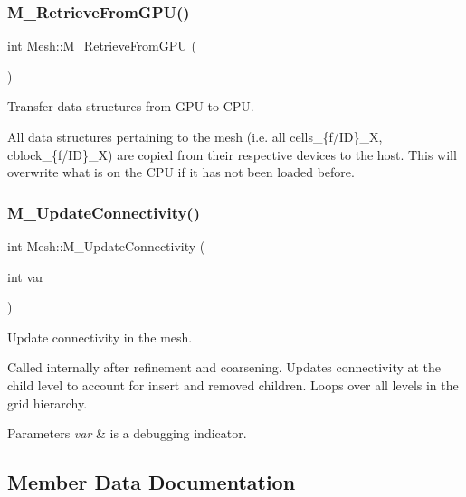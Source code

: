\subsubsection{\texorpdfstring{M\+\_\+\+Retrieve\+From\+G\+P\+U()}{M\_RetrieveFromGPU()}}
{\footnotesize\ttfamily int Mesh\+::\+M\+\_\+\+Retrieve\+From\+G\+PU (\begin{DoxyParamCaption}{ }\end{DoxyParamCaption})}



Transfer data structures from G\+PU to C\+PU. 

All data structures pertaining to the mesh (i.\+e. all cells\+\_\+\{f/\+ID\}\+\_\+X, cblock\+\_\+\{f/\+ID\}\+\_\+X) are copied from their respective devices to the host. This will overwrite what is on the C\+PU if it has not been loaded before. \mbox{\label{classMesh_af4d2218c68524d3c6eaa2065be392cb1}} 
\subsubsection{\texorpdfstring{M\+\_\+\+Update\+Connectivity()}{M\_UpdateConnectivity()}}
{\footnotesize\ttfamily int Mesh\+::\+M\+\_\+\+Update\+Connectivity (\begin{DoxyParamCaption}\item[{int}]{var }\end{DoxyParamCaption})\hspace{0.3cm}{\ttfamily [private]}}



Update connectivity in the mesh. 

Called internally after refinement and coarsening. Updates connectivity at the child level to account for insert and removed children. Loops over all levels in the grid hierarchy. 
\begin{DoxyParams}{Parameters}
{\em var} & is a debugging indicator. \\
\hline
\end{DoxyParams}


\subsection{Member Data Documentation}
\mbox{\label{classMesh_abbb0713042b9f27770c38e728cee0386}} 
